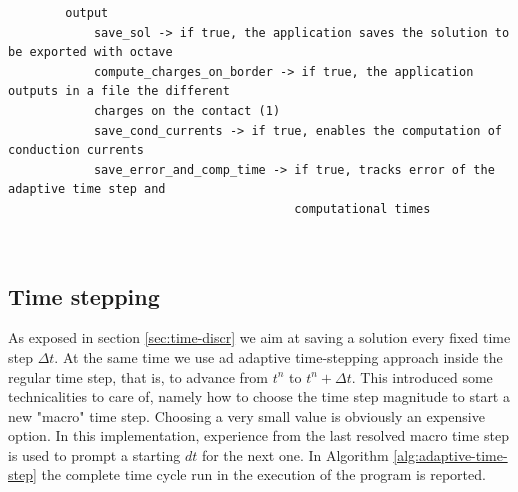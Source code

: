 \documentclass[11pt,a4paper]{article}
\begin{document}
\begin{minipage}{\textwidth}
	\vspace{3mm}
	\small
	\begin{verbatim}
		output
		    save_sol -> if true, the application saves the solution to be exported with octave
		    compute_charges_on_border -> if true, the application outputs in a file the different
		    charges on the contact (1)
		    save_cond_currents -> if true, enables the computation of conduction currents
		    save_error_and_comp_time -> if true, tracks error of the adaptive time step and
		                                computational times
	\end{verbatim}
\end{minipage}\\

\subsection{Time stepping}\label{sec:timecycle}
As exposed in section \ref{sec:time-discr} we aim at saving a solution every fixed time step \(\Delta t\). At the same time we use ad adaptive time-stepping approach inside the regular time step, that is, to advance from \(t^n\) to \(t^n+\Delta t\). This introduced some technicalities to care of, namely how to choose the time step magnitude to start a new "macro" time step. Choosing a very small value is obviously an expensive option. In this implementation, experience from the last resolved macro time step is used to prompt a starting \(dt\) for the next one. In Algorithm \ref{alg:adaptive-time-step} the complete time cycle run in the execution of the program is reported.
\end{document}
